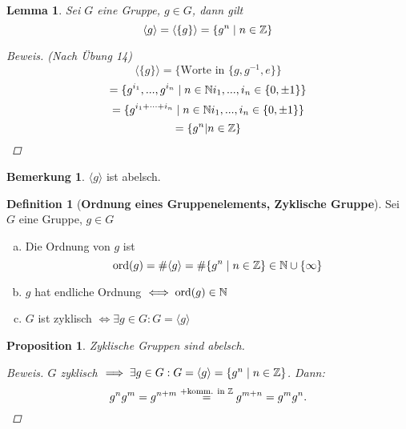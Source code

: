\documentclass[a4paper]{article}
\theoremstyle{plain}
\newtheorem{lemm}[thm]{Lemma}
\newtheorem{prop}[thm]{Proposition}
\theoremstyle{definition}
\newtheorem{defi}[thm]{Definition}
\newtheorem*{bem*}{Bemerkung}
\begin{document}
\begin{lemm}
Sei $G$ eine Gruppe, $g \in G$, dann gilt
$$\langle g \rangle = \langle \{g\} \rangle = \{g^{n} \mid n \in \Bbb Z\}$$
\begin{proof}[Beweis]
(Nach Übung 14) $$\langle \{g\} \rangle = \{\text{Worte in } \{g, g^{-1}, e\}\}$$
$$ = \{g^{i_{1}}, ..., g^{i_{n}} \mid n \in \Bbb N i_{1}, ..., i_{n} \in \{0, \pm 1\}\}$$
$$= \{g^{i_{1}+\cdots + i_{n}} \mid n \in \Bbb N i_{1}, ..., i_{n} \in \{0, \pm 1\}\}$$
$$= \{g^{n} | n \in \Bbb Z\}$$
\end{proof}
\end{lemm}
\begin{bem*}$\langle g \rangle$ ist abelsch.\end{bem*}
\begin{defi}[\textbf{Ordnung eines Gruppenelements, Zyklische Gruppe}]
  Sei $G$ eine Gruppe, $g \in G$

\begin{enumerate}[(a)]

 \item Die Ordnung von $g$ ist
$$\mathrm{ord}(g) = \# \langle g \rangle = \# \{ g^{n} \mid n \in \Bbb{Z} \} \in \Bbb{N} \cup \{\infty\}$$
 \item$g$ hat endliche Ordnung $\iff \mathrm{ord}(g) \in \Bbb N$
 \item $G$ ist zyklisch $\iff \exists g \in G : G = \langle g \rangle$
\end{enumerate}
\end{defi}


\begin{prop}
  Zyklische Gruppen sind abelsch.
  \begin{proof}[Beweis]
$G$ zyklisch $\implies \exists g \in G : G = \langle g \rangle = \{ g^{n} \mid n \in \Bbb{Z} \}$. Dann: $$g^{n}g^{m} = g^{n+m} \overset{+ \text{komm. in } \Bbb Z}= g^{m+n} = g^{m}g^{n}.$$
  \end{proof}
\end{prop}
\end{document}
